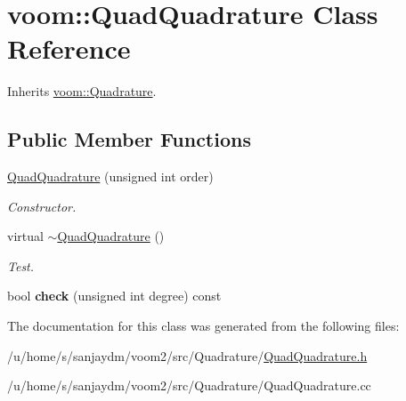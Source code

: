 \hypertarget{classvoom_1_1_quad_quadrature}{
\section{voom::QuadQuadrature Class Reference}
\label{classvoom_1_1_quad_quadrature}
}


Inherits \hyperlink{classvoom_1_1_quadrature}{voom::Quadrature}.\subsection*{Public Member Functions}
\begin{DoxyCompactItemize}
\item 
\hypertarget{classvoom_1_1_quad_quadrature_ad911cb1165ee336da4fc4375b772ca28}{
\hyperlink{classvoom_1_1_quad_quadrature_ad911cb1165ee336da4fc4375b772ca28}{QuadQuadrature} (unsigned int order)}
\label{classvoom_1_1_quad_quadrature_ad911cb1165ee336da4fc4375b772ca28}

\begin{DoxyCompactList}\small\item\em Constructor. \item\end{DoxyCompactList}\item 
\hypertarget{classvoom_1_1_quad_quadrature_ab14e886da0e6b67d44482553b23f9dd2}{
virtual \hyperlink{classvoom_1_1_quad_quadrature_ab14e886da0e6b67d44482553b23f9dd2}{$\sim$QuadQuadrature} ()}
\label{classvoom_1_1_quad_quadrature_ab14e886da0e6b67d44482553b23f9dd2}

\begin{DoxyCompactList}\small\item\em Test. \item\end{DoxyCompactList}\item 
\hypertarget{classvoom_1_1_quad_quadrature_af1a22b14e347ce401638b516f7fc1923}{
bool {\bfseries check} (unsigned int degree) const }
\label{classvoom_1_1_quad_quadrature_af1a22b14e347ce401638b516f7fc1923}

\end{DoxyCompactItemize}


The documentation for this class was generated from the following files:\begin{DoxyCompactItemize}
\item 
/u/home/s/sanjaydm/voom2/src/Quadrature/\hyperlink{_quad_quadrature_8h}{QuadQuadrature.h}\item 
/u/home/s/sanjaydm/voom2/src/Quadrature/QuadQuadrature.cc\end{DoxyCompactItemize}
